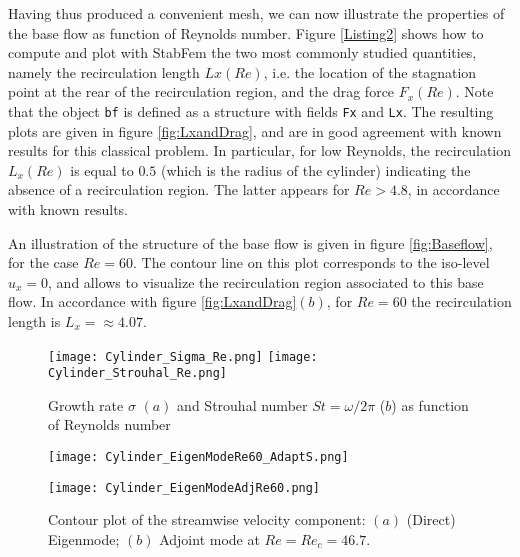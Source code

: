 \documentclass[twocolumn,10pt]{asme2ej}
\begin{document}
Having thus produced a convenient mesh, we can now illustrate the properties of the base flow as function of Reynolds number. Figure \ref{Listing2} shows how to compute and plot with StabFem the two most commonly studied quantities, namely the recirculation length $Lx(Re)$, i.e. the location of the stagnation point at the rear of the recirculation region, and the drag force $F_x(Re)$.
Note that the object \verb|bf| is defined as a structure with fields \verb|Fx| and \verb|Lx|. 
The resulting plots are given in figure \ref{fig:LxandDrag}, and are in good agreement with known results for this classical problem.
In particular, for low Reynolds, the recirculation $L_x(Re)$ is equal to $0.5$ (which is the radius of the cylinder) indicating the absence of a recirculation region. The latter appears for $Re > 4.8$, in accordance with known results.

An illustration of the structure of the base flow is given in figure \ref{fig:Baseflow},  for the case $Re = 60$. The contour line on this plot corresponds to the iso-level $u_x = 0$, and allows to visualize the recirculation region associated to this base flow. In accordance with figure \ref{fig:LxandDrag}$(b)$, for $Re = 60$ the recirculation length is $L_x = \approx 4.07$.









\begin{figure}
\texttt{[image: Cylinder\_Sigma\_Re.png]}
\texttt{[image: Cylinder\_Strouhal\_Re.png]}
\caption{Growth rate $\sigma$ $(a)$  and Strouhal number $St = \omega/2\pi$ ($b$) as function of Reynolds number}
\label{fig:SigmaOmega}
\end{figure}

\begin{figure}
\texttt{[image: Cylinder\_EigenModeRe60\_AdaptS.png]}%

\texttt{[image: Cylinder\_EigenModeAdjRe60.png]}
\caption{Contour plot of the streamwise velocity component: $(a)$ (Direct) Eigenmode; $(b)$ Adjoint mode at $Re=Re_c = 46.7$.}
\label{fig:Eigenmode}
\end{figure}
\end{document}
